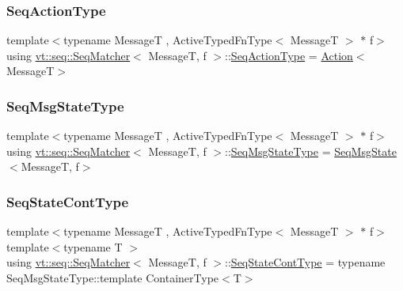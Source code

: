 \mbox{\label{structvt_1_1seq_1_1_seq_matcher_a180f9f54ad9d6d65893a36fe8b5b89e3}} 
\subsubsection{\texorpdfstring{Seq\+Action\+Type}{SeqActionType}}
{\footnotesize\ttfamily template$<$typename MessageT , Active\+Typed\+Fn\+Type$<$ Message\+T $>$ $\ast$ f$>$ \\
using \hyperlink{structvt_1_1seq_1_1_seq_matcher}{vt\+::seq\+::\+Seq\+Matcher}$<$ MessageT, f $>$\+::\hyperlink{structvt_1_1seq_1_1_seq_matcher_a180f9f54ad9d6d65893a36fe8b5b89e3}{Seq\+Action\+Type} =  \hyperlink{structvt_1_1seq_1_1_action}{Action}$<$MessageT$>$}

\mbox{\label{structvt_1_1seq_1_1_seq_matcher_ac01eb781503d3813043a3f417848f519}} 
\subsubsection{\texorpdfstring{Seq\+Msg\+State\+Type}{SeqMsgStateType}}
{\footnotesize\ttfamily template$<$typename MessageT , Active\+Typed\+Fn\+Type$<$ Message\+T $>$ $\ast$ f$>$ \\
using \hyperlink{structvt_1_1seq_1_1_seq_matcher}{vt\+::seq\+::\+Seq\+Matcher}$<$ MessageT, f $>$\+::\hyperlink{structvt_1_1seq_1_1_seq_matcher_ac01eb781503d3813043a3f417848f519}{Seq\+Msg\+State\+Type} =  \hyperlink{structvt_1_1seq_1_1_seq_msg_state}{Seq\+Msg\+State}$<$MessageT, f$>$}

\mbox{\label{structvt_1_1seq_1_1_seq_matcher_ad8e84a5a494218cd582d8467552b5ff7}} 
\subsubsection{\texorpdfstring{Seq\+State\+Cont\+Type}{SeqStateContType}}
{\footnotesize\ttfamily template$<$typename MessageT , Active\+Typed\+Fn\+Type$<$ Message\+T $>$ $\ast$ f$>$ \\
template$<$typename T $>$ \\
using \hyperlink{structvt_1_1seq_1_1_seq_matcher}{vt\+::seq\+::\+Seq\+Matcher}$<$ MessageT, f $>$\+::\hyperlink{structvt_1_1seq_1_1_seq_matcher_ad8e84a5a494218cd582d8467552b5ff7}{Seq\+State\+Cont\+Type} =  typename Seq\+Msg\+State\+Type\+::template Container\+Type$<$T$>$}

